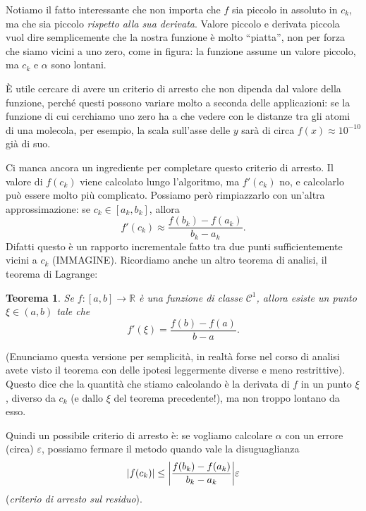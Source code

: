 \documentclass[a4paper]{report}
\DeclarePairedDelimiter{\abs}{\lvert}{\rvert}
\newtheorem{theorem}{Teorema}[chapter]
\theoremstyle{definiton}
\theoremstyle{remark}
\newcommand{\x}{\mathbf{x}}
\begin{document}
Notiamo il fatto interessante che non importa che $f$ sia piccolo in assoluto in $c_k$, ma che sia piccolo \emph{rispetto alla sua derivata}. Valore piccolo e derivata piccola vuol dire semplicemente che la nostra funzione è molto ``piatta'', non per forza che siamo vicini a uno zero, come in figura: la funzione assume un valore piccolo, ma $c_k$ e $\alpha$ sono lontani.
\begin{center}
\end{center}
È utile cercare di avere un criterio di arresto che non dipenda dal valore della funzione, perché questi possono variare molto a seconda delle applicazioni: se la funzione di cui cerchiamo uno zero ha a che vedere con le distanze tra gli atomi di una molecola, per esempio, la scala sull'asse delle $y$ sarà di circa $f(x) \approx 10^{-10}$ già di suo.

Ci manca ancora un ingrediente per completare questo criterio di arresto. Il valore di $f(c_k)$ viene calcolato lungo l'algoritmo, ma $f'(c_k)$ no, e calcolarlo può essere molto più complicato. Possiamo però rimpiazzarlo con un'altra approssimazione: se $c_k \in [a_k, b_k]$, allora
\[
f'(c_k) \approx \frac{f(b_k) - f(a_k)}{b_k - a_k}.
\]
Difatti questo è un rapporto incrementale fatto tra due punti sufficientemente vicini a $c_k$ (IMMAGINE). Ricordiamo anche un altro teorema di analisi, il teorema di Lagrange:
\begin{theorem}
    Se $f: [a,b] \to \mathbb{R}$ è una funzione di classe $\mathcal{C}^1$, allora esiste un punto $\xi \in (a,b)$ tale che
    \[
        f'(\xi) = \frac{f(b)-f(a)}{b-a}.
    \]
\end{theorem}
(Enunciamo questa versione per semplicità, in realtà forse nel corso di analisi avete visto il teorema con delle ipotesi leggermente diverse e meno restrittive). Questo dice che la quantità che stiamo calcolando è la derivata di $f$ in un punto $\xi$, diverso da $c_k$ (e dallo $\xi$ del teorema precedente!), ma non troppo lontano da esso.

Quindi un possibile criterio di arresto è: se vogliamo calcolare $\alpha$ con un errore (circa) $\varepsilon$, possiamo fermare il metodo quando vale la disuguaglianza 
\[
\abs{f(c_k)} \leq \abs*{\frac{f(b_k) - f(a_k)}{b_k-a_k}} \varepsilon
\]
(\emph{criterio di arresto sul residuo}).
\end{document}
